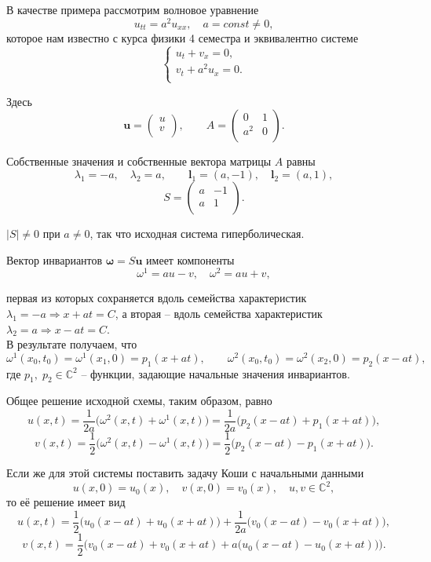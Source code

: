 \documentclass[../main.tex]{subfile}
\begin{document}
\begin{example}
	В качестве примера рассмотрим волновое уравнение
	\[u_{tt}=a^2u_{xx},\quad a=const\ne 0,\]
	которое нам известно с курса физики 4 семестра и эквивалентно
	системе
	\[\begin{cases}
		u_t+v_x=0, \\
		v_t+a^2u_x=0. \\
	\end{cases}\]

	Здесь
	\[\boldsymbol{u}=
		\begin{pmatrix}
			u \\
			v \\
		\end{pmatrix},
	\qquad
	A=
		\begin{pmatrix}
			0 & 1 \\
			a^2 & 0 \\
		\end{pmatrix}.
	\]

	Собственные значения и собственные вектора матрицы $A$ равны
	\[\lambda_1=-a,\quad \lambda_2=a,\qquad
	\boldsymbol{l}_1=(a,-1),\quad \boldsymbol{l}_2=(a,1),\]
	\[
		S=
		\begin{pmatrix}
			a & -1 \\
			a & 1  \\
		\end{pmatrix}.
	\]

	$|S|\ne 0$ при $a\ne 0$, так что исходная система гиперболическая.

	Вектор инвариантов $\boldsymbol{\omega}=S\boldsymbol{u}$ имеет
	компоненты
	\[\omega^1=au-v,\quad \omega^2=au+v,\]

	первая из которых сохраняется вдоль семейства характеристик
	$\lambda_1=-a\Rightarrow x+at=C$, а вторая -- вдоль семейства
	характеристик $\lambda_2=a\Rightarrow x-at=C$. \\

	
	
	В результате получаем, что
	\[\omega^1(x_0,t_0)=\omega^1(x_1,0)=p_1(x+at),\qquad
	  \omega^2(x_0,t_0)=\omega^2(x_2,0)=p_2(x-at),\]
	где $p_1,\;p_2\in \mathbb C^2$ -- функции, задающие начальные значения
	инвариантов.
	
	Общее решение исходной схемы, таким образом, равно
	\[u(x,t)=\frac{1}{2a}\big(\omega^2(x,t)+\omega^1(x,t)\big)=
	\frac{1}{2a}\big(p_2(x-at)+p_1(x+at)\big),\]
	\[v(x,t)=\frac{1}{2}\big(\omega^2(x,t)-\omega^1(x,t)\big)=
	\frac{1}{2}\big(p_2(x-at)-p_1(x+at)\big).\]
	
	Если же для этой системы поставить задачу Коши с начальными данными
	\[u(x,0)=u_0(x),\quad v(x,0)=v_0(x),\quad u,v\in\mathbb C^2,\]
	то её решение имеет вид
	\[u(x,t)=\frac{1}{2}\big(u_0(x-at)+u_0(x+at)\big)+
	\frac{1}{2a}\big(v_0(x-at)-v_0(x+at)\big),\]
	\[v(x,t)=\frac{1}{2}\Big(v_0(x-at)+v_0(x+at)+
	a\big(u_0(x-at)-u_0(x+at)\big)\Big).\]
\end{example}
\end{document}
